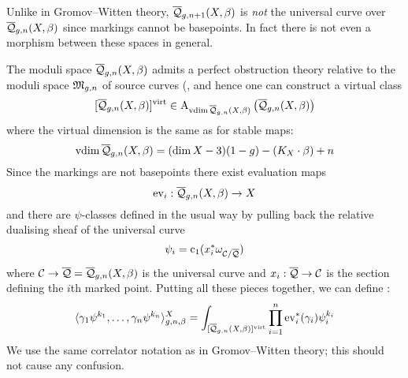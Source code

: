 
\begin{remark} Unlike in Gromov--Witten theory, $\overline{\mathcal Q}_{g,n+1}(X,\beta)$ is \emph{not} the universal curve over $\overline{\mathcal Q}_{g,n}(X,\beta)$ since markings cannot be basepoints. In fact there is not even a morphism between these spaces in general.\end{remark}

The moduli space $\overline{\mathcal Q}_{g,n}(X,\beta)$ admits a perfect obstruction theory relative to the moduli space $\mathfrak M_{g,n}$ of source curves (\cite[\S 5]{CF-K}, and hence one can construct a virtual class
\begin{equation*} [\overline{\mathcal Q}_{g,n}(X,\beta)]^{\operatorname{virt}} \in \operatorname{A}_{\operatorname{vdim}\overline{\mathcal Q}_{g,n}(X,\beta)} \left( \overline{\mathcal Q}_{g,n}(X,\beta) \right) \end{equation*}
where the virtual dimension is the same as for stable maps:
\begin{equation*} \operatorname{vdim}\overline{\mathcal Q}_{g,n}(X,\beta) = (\dim{X} - 3)(1-g) - (K_X \cdot \beta) + n \end{equation*}
Since the markings are not basepoints there exist evaluation maps
\begin{equation*} \operatorname{ev}_i : \overline{\mathcal Q}_{g,n}(X,\beta) \rightarrow X \end{equation*}
and there are $\psi$-classes defined in the usual way by pulling back the relative dualising sheaf of the universal curve
\begin{equation*} \psi_i = \operatorname{c}_1(x_i^* \omega_{\mathcal{C}/\overline{\mathcal{Q}}}) \end{equation*}
where $\mathcal{C} \rightarrow \overline{\mathcal{Q}} = \overline{\mathcal Q}_{g,n}(X,\beta)$ is the universal curve and $x_i : \overline{\mathcal{Q}} \rightarrow \mathcal{C}$ is the section defining the $i$th marked point. Putting all these pieces together, we can define :
\begin{equation*} \langle \gamma_1 \psi^{k_1} , \ldots, \gamma_n \psi^{k_n} \rangle_{g,n,\beta}^X = \int_{[\overline{\mathcal Q}_{g,n}(X,\beta)]^{\operatorname{virt}}} \prod_{i=1}^n \operatorname{ev}_i^* (\gamma_i) \psi_i^{k_i} \end{equation*}
We use the same correlator notation as in Gromov--Witten theory; this should not cause any confusion.

